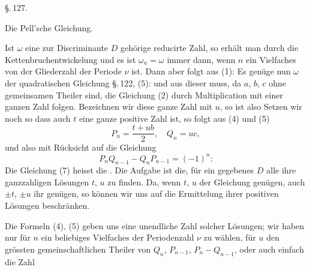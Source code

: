 \begin{center}
\S.\,127.

Die Pell'sche Gleichung.
\end{center}

Ist $\omega$ eine zur Discriminante $D$ gehörige reducirte Zahl, so
erhält man durch die Kettenbruchentwickelung
und es ist $\omega_n = \omega$ immer dann, wenn $n$ ein Vielfaches von der
Gliederzahl der Periode $\nu$ ist. Dann aber folgt aus (1):
Es genüge nun $\omega$ der quadratischen Gleichung \S.\,122, (5):
und aus dieser muss, da $a$, $b$, $c$ ohne gemeinsamen Theiler
sind, die Gleichung (2) durch Multiplication mit einer ganzen
Zahl folgen. Bezeichnen wir diese ganze Zahl mit $u$, so ist also
Setzen wir noch
so dass auch $t$ eine ganze positive Zahl ist, so folgt aus (4) und (5)
\[
P_n = \frac{t + u b}{2}, \quad Q_n = u c,
\]
und also mit Rücksicht auf die Gleichung
\[
P_n Q_{n-1} - Q_n P_{n-1} = (-1)^n\text{:}
\]
Die Gleichung (7) heisst die . Die
Aufgabe ist die, für ein gegebenes $D$ alle ihre ganzzahligen
Lösungen $t$, $u$ zu finden. Da, wenn $t$, $u$ der Gleichung genügen,
auch $\pm t$, $\pm u$ ihr genügen, so können wir uns auf die Ermittelung
ihrer positiven Lösungen beschränken.

Die Formeln (4), (5) geben uns eine unendliche Zahl solcher
Lösungen; wir haben nur für $n$ ein beliebiges Vielfaches der
Periodenzahl $\nu$ zu wählen, für $u$ den grössten gemeinschaftlichen
Theiler von $Q_n$, $P_{n-1}$, $P_n - Q_{n-1}$, oder auch einfach die Zahl
